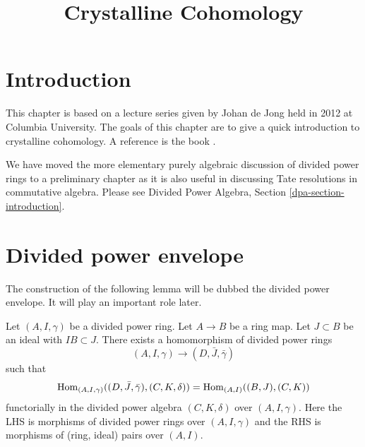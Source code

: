 

%


\title{Crystalline Cohomology}


\maketitle

\label{section-phantom}

\tableofcontents



\section{Introduction}
\label{section-introduction}

\noindent
This chapter is based on a lecture series given by Johan de Jong
held in 2012 at Columbia University.
The goals of this chapter are to give a quick introduction to
crystalline cohomology. A reference is the book \cite{Berthelot}.

\medskip\noindent
We have moved the more elementary purely algebraic discussion of divided
power rings to a preliminary chapter as it is also useful
in discussing Tate resolutions in commutative algebra.
Please see Divided Power Algebra, Section \ref{dpa-section-introduction}.













\section{Divided power envelope}
\label{section-divided-power-envelope}

\noindent
The construction of the following lemma will be dubbed the
divided power envelope. It will play an important role later.

\begin{lemma}
\label{lemma-divided-power-envelope}
Let $(A, I, \gamma)$ be a divided power ring.
Let $A \to B$ be a ring map. Let $J \subset B$ be an ideal
with $IB \subset J$. There exists a homomorphism of
divided power rings
$$
(A, I, \gamma) \longrightarrow (D, \bar J, \bar \gamma)
$$
such that
$$
\mathop{\mathrm{Hom}}\nolimits_{(A, I, \gamma)}((D, \bar J, \bar \gamma), (C, K, \delta)) =
\mathop{\mathrm{Hom}}\nolimits_{(A, I)}((B, J), (C, K))
$$
functorially in the divided power algebra $(C, K, \delta)$ over
$(A, I, \gamma)$. Here the LHS is morphisms of divided
power rings over $(A, I, \gamma)$ and the RHS is morphisms of
(ring, ideal) pairs over $(A, I)$.
\end{lemma}

